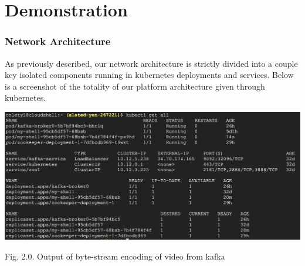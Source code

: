 \documentclass[10pt,journal,compsoc,onecolumn,draftclsnofoot]{IEEEtran}
\begin{document}
\section{Demonstration}
\subsubsection{Network Architecture}
As previously described, our network architecture is strictly divided into a couple key isolated components running in kubernetes deployments and services. Below is a screenshot of the totality of our platform architecture given through kubernetes. 
\begin{center}
\includegraphics[width=.95\textwidth]{kube-output.png}\\
\end{center}
\hspace*{.5cm}\small{Fig. 2.0. Output of byte-stream encoding of video from kafka}
\end{document}
